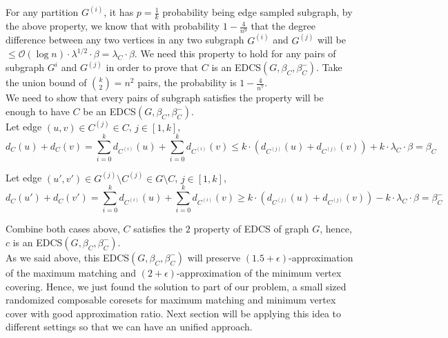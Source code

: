 \documentclass[12pt]{report}
\begin{document}
{\begin{itemize}
\end{itemize}

For any partition $G^{(i)}$, it has $p = \frac{1}{k}$ probability being edge sampled subgraph, by the above property, we know that with probability $1 - \frac{4}{n^9}$ that the degree difference between any two vertices in any two subgraph $G^{(i)}$ and $G^{(j)}$ will be $\leq \mathcal{O}(\log {n}) \cdot \lambda^{1/2} \cdot \beta = \lambda_C \cdot \beta$. We need this property to hold for any pairs of subgraph $G^{i}$ and $G^{(j)}$ in order to prove that $C$ is an EDCS$(G,\beta_C,\beta_C^-)$. Take the union bound of ${k \choose 2} = n^2$ pairs, the probability is $1 - \frac{4}{n^7}$.\\

We need to show that every pairs of subgraph satisfies the property will be enough to have $C$ be an EDCS$(G,\beta_C,\beta_C^-)$.\\

Let edge $(u,v) \in C^{(j)} \in C$, $j \in [1,k]$, 
$$ d_C(u) + d_C(v) = \sum_{i = 0}^k d_{C^{(i)}}(u) + \sum_{i = 0}^k d_{C^{(i)}}(v) \leq k\cdot(d_{C^{(j)}}(u) + d_{C^{(j)}}(v)) + k\cdot\lambda_C\cdot\beta = \beta_C$$

Let edge $(u',v') \in G^{(j)} \setminus C^{(j)} \in G \setminus C$, $j \in [1,k]$,
$$ d_C(u') + d_C(v') = \sum_{i = 0}^k d_{C^{(i)}}(u) + \sum_{i = 0}^k d_{C^{(i)}}(v) \geq k\cdot(d_{C^{(j)}}(u) + d_{C^{(j)}}(v)) - k\cdot\lambda_C\cdot\beta = \beta_C^-$$

Combine both cases above, $C$ satisfies the $2$ property of EDCS of graph $G$, hence, $c$ is an EDCS$(G,\beta_C,\beta_C^-)$.\\

As we said above, this EDCS$(G,\beta_C,\beta_C^-)$ will preserve $(1.5 + \epsilon)$-approximation of the maximum matching and $(2 + \epsilon)$-approximation of the minimum vertex covering. Hence, we just found the solution to part of our problem, a small sized randomized composable coresets for maximum matching and minimum vertex cover with good approximation ratio. Next section will be applying this idea to different settings so that we can have an unified approach.\\


}
\end{document}

